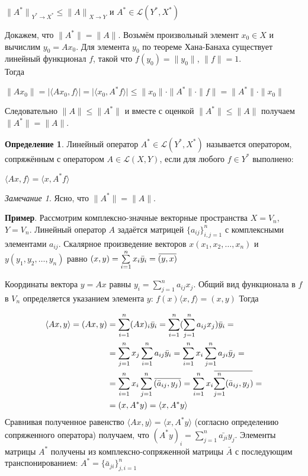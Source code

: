 \documentclass[12pt,a4paper,titlepage,oneside]{book}
\newcommand{\overbar}[1]{\mkern 1.5mu\overline{\mkern-1.5mu#1\mkern-1.5mu}\mkern 1.5mu}
\theoremstyle{definition}
\newtheorem*{definition}{Определение}
\theoremstyle{plain}
\theoremstyle{remark}
\newtheorem*{remark}{Замечание}
\theoremstyle{remark}
\theoremstyle{remark}
\theoremstyle{remark}
\theoremstyle{plain}
\theoremstyle{plain}
\begin{document}
\begin{center}
${\lVert A^* \lVert}_{Y^* \to X^*} \leqslant 
{\lVert A \lVert}_{X \to Y}$ и $A^* \in \mathcal{L}(Y^*,X^*)$
\end{center}
Докажем, что $\lVert A^* \lVert = 
\lVert A \lVert$. Возьмём произвольный элемент $x_0 \in X$ и вычислим $y_0=Ax_0$. Для элемента $y_0$ по теореме Хана-Банаха существует линейный функционал $f$, такой что
$f(y_0)= \lVert y_0 \lVert$, $\lVert f \lVert =1$.\\
Тогда
\begin{center}
$\lVert Ax_0 \lVert = \vert  \langle Ax_0,f \rangle  \vert =
\vert  \langle x_0,A^*f \rangle  \vert \leqslant 
\lVert x_0 \lVert \cdot \lVert A^* \lVert
\cdot \lVert f \lVert = \lVert A^* \lVert
\cdot \lVert x_0 \lVert$
\end{center}
Следовательно $\lVert A \lVert \leqslant
\lVert A^* \lVert$ и вместе с оценкой $\lVert A^* \lVert \leqslant 
\lVert A \lVert$ получаем $\lVert A^* \lVert = 
\lVert A \lVert$.
\begin{definition}
Линейный оператор $A^* \in \mathcal{L}(Y^*,X^*)$ называется оператором, сопряжённым с оператором $A \in \mathcal{L}(X,Y)$, если для любого $f \in Y^*$ выполнено:
\begin{center}
$ \langle Ax,f \rangle  =  \langle x,A^*f \rangle $
\end{center}
\end{definition}
\begin{remark}
Ясно, что $\lVert A^* \lVert = 
\lVert A \lVert$.
\end{remark}


\textbf{Пример}.
Рассмотрим комплексно-значные векторные пространства $X=V_n$, $Y=V_n$. Линейный оператор $A$ задаётся матрицей $\lbrace a_{ij} \rbrace_{i,j=1}^n$ с комплексными элементами $a_{ij}$. Скалярное произведение векторов $x(x_1,x_2,\ldots,x_n)$ и $y(y_1,y_2,\ldots,y_n)$ равно $(x,y) = \sum\limits_{i=1}^n x_i \bar{y}_i = \overbar{(y,x)}$

Координаты вектора $y=Ax$ равны $y_i = \sum\limits_{j=1}^n a_{ij} x_j$. Общий вид функционала в $f$ в $V_n$ определяется указанием элемента $y$:
$f(x) \langle x,f \rangle = (x,y)$
Тогда

\begin{align*}
\langle Ax,y \rangle = (Ax,y) &= \sum\limits_{i=1}^n (Ax)_i \bar{y}_i = \sum\limits_{i=1}^n (\sum\limits_{j=1}^n a_{ij}x_j)\bar{y}_i =\\
&= \sum\limits_{j=1}^n x_j \sum\limits_{i=1}^n a_{ij}\bar{y}_i = \sum\limits_{i=1}^n x_i \sum\limits_{j=1}^n a_{ji}\bar{y}_j =\\
&= \sum\limits_{i=1}^n x_i \sum\limits_{j=1}^n \overbar{(\bar{a}_{ij},y_j)} = \sum\limits_{i=1}^n x_i \overbar{\sum\limits_{j=1}^n(\bar{a}_{ij} ,y_j)} =\\
&= (x,A^{*}y)=\langle x, A^{*}y \rangle
\end{align*} 
Сравнивая полученное равенство $\langle Ax,y \rangle = \langle x, A^{*}y \rangle$ (согласно определению сопряженного оператора) получаем, что
$(A^{*}y)_i = \sum\limits_{j=1}^n \bar{a_{ji}} y_j$.
Элементы матрицы $A^{*}$ получены из комплексно-сопряженной матрицы $\bar{A}$ с последующим транспонированием: $A^{*}=\{\bar{a}_{ji}\}_{j,i=1}^n$
\end{document}
